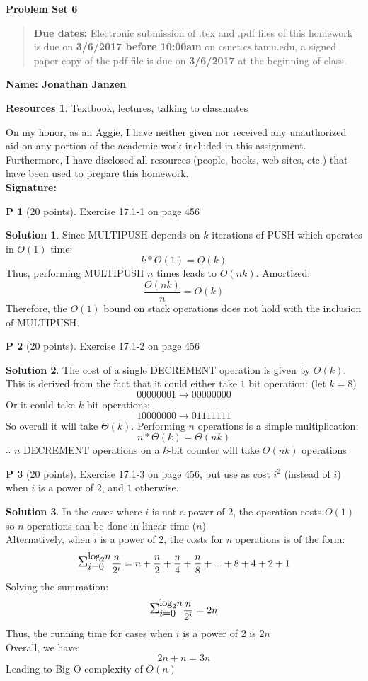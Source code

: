 \documentclass{article}
\theoremstyle{definition}
\newtheorem{problem}{P}
\newtheorem*{solution}{Solution}
\newtheorem*{resources}{Resources}
\newcommand{\name}[1]{\noindent\textbf{Name: #1}}
\newcommand{\honor}{\noindent On my honor, as an Aggie, I have neither
  given nor received any unauthorized aid on any portion of the
  academic work included in this assignment. Furthermore, I have
  disclosed all resources (people, books, web sites, etc.) that have
  been used to prepare this homework. \\[1ex]
 \textbf{Signature:} \underline{\hspace*{5cm}} }
\newcommand{\problemset}[1]{\begin{center}\textbf{Problem Set #1}\end{center}}
\newcommand{\duedate}[2]{\begin{quote}\textbf{Due dates:} Electronic submission of .tex
    and .pdf files of this homework is due on \textbf{#1} on csnet.cs.tamu.edu, a signed paper copy
    of the pdf file is due on \textbf{#2} at the beginning of
    class. \end{quote} }
\begin{document}
\problemset{6}
\duedate{3/6/2017 before 10:00am}{3/6/2017}
\name{Jonathan Janzen}
\begin{resources} Textbook, lectures, talking to classmates
\end{resources}
\honor
\newpage


\begin{problem}[20 points]
Exercise 17.1-1 on page 456
\end{problem}
\begin{solution}
Since MULTIPUSH depends on $k$ iterations of PUSH which operates in $O(1)$ time:
$$ k * O(1) = O(k)$$
Thus, performing MULTIPUSH $n$ times leads to $O(nk)$. Amortized:
$$ \frac{O(nk)}{n} = O(k) $$
Therefore, the $O(1)$ bound on stack operations does not hold with the inclusion of MULTIPUSH.
\end{solution}

\begin{problem}[20 points]
Exercise 17.1-2 on page 456
\end{problem}
\begin{solution}
The cost of a single DECREMENT operation is given by $\Theta(k)$. This is derived from the fact that it could either take $1$ bit operation: (let $k=8$)
$$00000001 \rightarrow 00000000$$
Or it could take $k$ bit operations:
$$10000000 \rightarrow 01111111$$
So overall it will take $\Theta(k)$. Performing $n$ operations is a simple multiplication:
$$n * \Theta(k) = \Theta(nk)$$
$\therefore$ $n$ DECREMENT operations on a $k$-bit counter will take $\Theta(nk)$ operations
\end{solution}

\begin{problem}[20 points]
Exercise 17.1-3 on page 456, but use as cost $i^2$ (instead of $i$) when $i$ is a power of $2$, and $1$ otherwise. 
\end{problem}
\begin{solution}
In the cases where $i$ is not a power of 2, the operation costs $O(1)$ so $n$ operations can be done in linear time ($n$)\\
Alternatively, when $i$ is a power of 2, the costs for $n$ operations is of the form: 
$$ \mathlarger{\mathlarger{\Sigma_{i=0}^{\text{log}_2 n}}} \frac{n}{2^i} = n + \frac{n}{2} + \frac{n}{4} + \frac{n}{8} + ... + 8 + 4 + 2 + 1 $$
Solving the summation:
$$ \mathlarger{\mathlarger{\Sigma_{i=0}^{\text{log}_2 n}}} \frac{n}{2^i} = 2n$$
Thus, the running time for cases when $i$ is a power of 2 is $2n$\\
Overall, we have:
$$ 2n + n = 3n $$
Leading to Big O complexity of $O(n)$
\end{solution}
\end{document}

